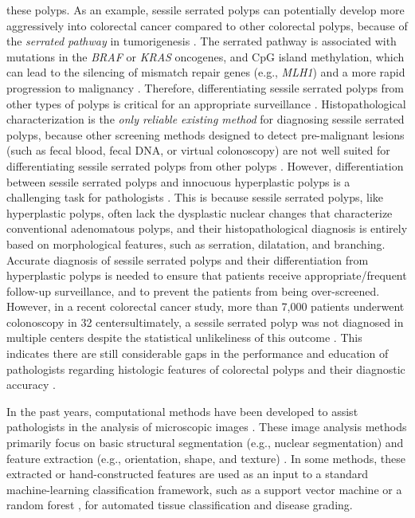 \documentclass[review]{elsarticle}
\begin{document}
these polyps. As an example, sessile serrated polyps can potentially develop more aggressively into colorectal cancer compared to other colorectal polyps, because of the \textit{serrated pathway} in tumorigenesis \citep{leggett2010role}. The serrated pathway is associated with mutations in the \textit{BRAF} or \textit{KRAS} oncogenes, and CpG island methylation, which can lead to the silencing of mismatch repair genes (e.g., \textit{MLH1}) and a more rapid progression to malignancy \citep{vu2011individuals}. Therefore, differentiating sessile serrated polyps from other types of polyps is critical for an appropriate surveillance \citep{biscotti2005assisted}. Histopathological characterization is the \textit{only reliable existing method} for diagnosing sessile serrated polyps, because other screening methods designed to detect pre-malignant lesions (such as fecal blood, fecal DNA, or virtual colonoscopy) are not well suited for differentiating sessile serrated polyps from other polyps \citep{kahi2015does}. However, differentiation between sessile serrated polyps and innocuous hyperplastic polyps is a challenging task for pathologists \citep{vu2011individuals, aptoula2013mitosis, irshad2014methods, veta2015assessment}. This is because sessile serrated polyps, like hyperplastic polyps, often lack the dysplastic nuclear changes that characterize conventional adenomatous polyps, and their histopathological diagnosis is entirely based on morphological features, such as serration, dilatation, and branching. Accurate diagnosis of sessile serrated polyps and their differentiation from hyperplastic polyps is needed to ensure that patients receive appropriate/frequent follow-up surveillance, and to prevent the patients from being over-screened. However, in a recent colorectal cancer study, more than 7,000 patients underwent colonoscopy in 32 centers\textemdash ultimately, a sessile serrated polyp was not diagnosed in multiple centers despite the statistical unlikeliness of this outcome \citep{snover2011update}. This indicates there are still considerable gaps in the performance and education of pathologists regarding histologic features of colorectal polyps and their diagnostic accuracy \citep{abdeljawad2015sessile}.

In the past years, computational methods have been developed to assist pathologists in the analysis of microscopic images \citep{gurcan2009histopathological, madabhushi2016image, naik2007gland}. These image analysis methods primarily focus on basic structural segmentation (e.g., nuclear segmentation) \citep{nakhleh2006error, raab2005clinical, malkin1998comparison} and feature extraction (e.g., orientation, shape, and texture) \citep{gil2002image, boucheron2008object, sertel2009histopathological, doyle2007automated}. In some methods, these extracted or hand-constructed features are used as an input to a standard machine-learning classification framework, such as a support vector machine \citep{rajpoot2004svm, kallenbach2013immunohistochemistry} or a random forest \citep{sims2003image}, for automated tissue classification and disease grading.
\end{document}
